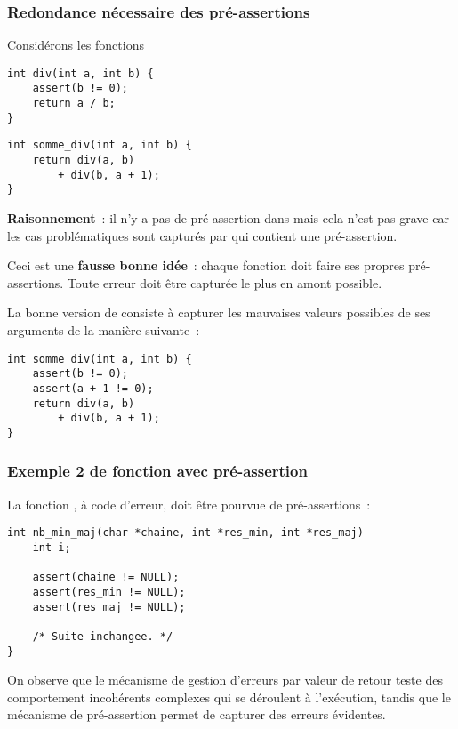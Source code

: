 \begin{frame}[fragile]
    \frametitle{Redondance nécessaire des pré-assertions}
Considérons les fonctions 
\begin{multicols}{2}
\begin{lstlisting}
int div(int a, int b) {
    assert(b != 0);
    return a / b;
}

\end{lstlisting}
\begin{lstlisting}
int somme_div(int a, int b) {
    return div(a, b)
        + div(b, a + 1);
}
\end{lstlisting}
\end{multicols}
{\bf Raisonnement}~: il n'y a pas de pré-assertion dans 
mais cela n'est pas grave car les cas problématiques sont capturés par
 qui contient une pré-assertion.
\medskip

Ceci est une {\bf fausse bonne idée}~: chaque fonction doit faire ses
propres pré-assertions. Toute erreur doit être capturée le plus en amont
possible.
\medskip

\begin{multicols}{2}
La bonne version de  consiste à capturer les
mauvaises valeurs possibles de ses arguments de la manière suivante~:
\bigskip

\begin{lstlisting}
int somme_div(int a, int b) {
    assert(b != 0);
    assert(a + 1 != 0);
    return div(a, b)
        + div(b, a + 1);
}
\end{lstlisting}
\end{multicols}
\end{frame}

\begin{frame}[fragile] \frametitle{Exemple 2 de fonction avec pré-assertion}
La fonction , à code d'erreur, doit être pourvue
de pré-assertions~:
\begin{lstlisting}
int nb_min_maj(char *chaine, int *res_min, int *res_maj)
    int i;
    
    assert(chaine != NULL);
    assert(res_min != NULL);
    assert(res_maj != NULL);
    
    /* Suite inchangee. */
}
\end{lstlisting}

On observe que le mécanisme de gestion d'erreurs par valeur de retour
teste des comportement incohérents complexes qui se déroulent à 
l'exécution, tandis que le mécanisme de pré-assertion permet de capturer 
des erreurs évidentes.
\end{frame}

